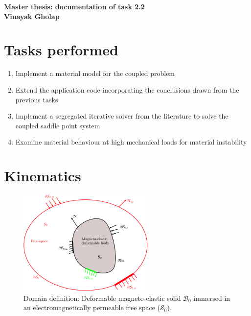 \documentclass[11pt,a4paper,final]{article}
\begin{document}
\begin{center}
\textbf{\Large Master thesis: documentation of task 2.2}\\ \vspace{0.25cm}
\textbf{\large Vinayak Gholap}
\end{center}

\section{Tasks performed}
\begin{enumerate}
\item Implement a material model for the coupled problem
\item Extend the application code incorporating the conclusions drawn from the previous tasks
\item Implement a segregated iterative solver from the literature \cite{Benzi2005} to solve the coupled saddle point system
\item Examine material behaviour at high mechanical loads for material instability
\end{enumerate}

\section{Kinematics}

\begin{figure}[h]
\centering
\includegraphics[width=0.6\textwidth]{kinematics_potato_coupled.pdf}
\caption{Domain definition: Deformable magneto-elastic solid $\mathcal{B}_0$ immersed in an electromagnetically permeable free space ($\mathcal{S}_0$).}
\label{fig:3.2}
\end{figure}
\end{document}
